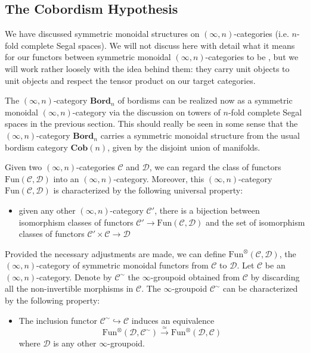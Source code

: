 \documentclass[a4paper,11pt]{article}
\newcommand{\ccal}{\mathcal{C}}
\newcommand{\dcal}{\mathcal{D}}
\theoremstyle{plain}
\theoremstyle{definition}
\theoremstyle{remark}
\begin{document}
\subsection{The Cobordism Hypothesis}


We have discussed symmetric monoidal structures on $(\infty, n)$-categories (i.e. $n$-fold complete Segal spaces). We will not discuss here with detail what it means for our functors between symmetric monoidal $(\infty, n)$-categories to be , but we will work rather loosely with the idea behind them: they carry unit objects to unit objects and respect the tensor product on our target categories. 

The $(\infty, n)$-category $\textbf{Bord}_n$ of bordisms can be realized now as a symmetric monoidal $(\infty, n)$-category via the discussion on towers of $n$-fold complete Segal spaces in the previous section. This should really be seen in some sense that the $(\infty, n)$-category $\textbf{Bord}_n$ carries a symmetric monoidal structure from the usual bordism category $\textbf{Cob}(n)$, given by the disjoint union of manifolds. 


Given two $(\infty, n)$-categories $\ccal$ and $\dcal$, we can regard the class of functors $\text{Fun}(\ccal, \dcal)$ into an $(\infty, n)$-category. Moreover, this $(\infty, n)$-category $\text{Fun}(\ccal, \dcal)$ is characterized by the following universal property: 
\begin{itemize}
    \item given any other $(\infty, n)$-category $\ccal'$, there is a bijection between isomorphism classes of functors $\ccal' \to \text{Fun}(\ccal, \dcal)$ and the set of isomorphism classes of functors $\ccal' \times \ccal \to \dcal$
\end{itemize}





Provided the necessary adjustments are made, we can define $\text{Fun}^{\otimes}(\ccal, \dcal)$, the $(\infty, n)$-category of symmetric monoidal functors from $\ccal$ to $\dcal$. 
Let $\ccal$ be an $(\infty, n)$-category. Denote by $\ccal^{\sim}$ the $\infty$-groupoid obtained from $\ccal$ by discarding all the non-invertible morphisms in $\ccal$. The $\infty$-groupoid $\ccal^{\sim}$ can be characterized by the following property: 
\begin{itemize}
    \item The inclusion functor $\ccal^{\sim} \hookrightarrow \ccal$ induces an equivalence 
    $$\text{Fun}^{\otimes }(\dcal, \ccal^{\sim}) \xrightarrow{\simeq} \text{Fun}^{\otimes}(\dcal, \ccal)$$
    where $\dcal$ is any other $\infty$-groupoid. 
\end{itemize}
\end{document}
